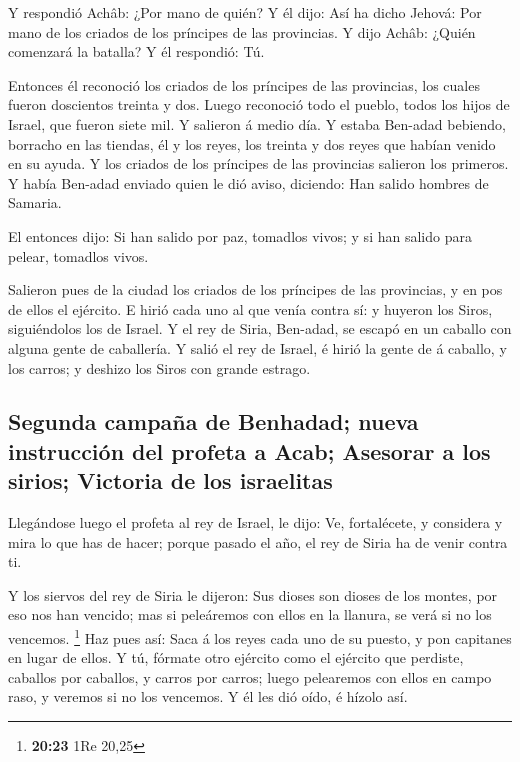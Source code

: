 Y respondió Achâb: ¿Por mano de quién? Y él dijo: Así ha
dicho Jehová: Por mano de los criados de los príncipes de las
provincias. Y dijo Achâb: ¿Quién comenzará la batalla? Y él respondió:
Tú.

 Entonces él reconoció los criados de los príncipes de las
provincias, los cuales fueron doscientos treinta y dos. Luego reconoció
todo el pueblo, todos los hijos de Israel, que fueron siete mil.
 Y salieron á medio día. Y estaba Ben-adad bebiendo,
borracho en las tiendas, él y los reyes, los treinta y dos reyes que
habían venido en su ayuda.  Y los criados de los príncipes
de las provincias salieron los primeros. Y había Ben-adad enviado quien
le dió aviso, diciendo: Han salido hombres de Samaria.

 El entonces dijo: Si han salido por paz, tomadlos vivos; y
si han salido para pelear, tomadlos vivos.

 Salieron pues de la ciudad los criados de los príncipes de
las provincias, y en pos de ellos el ejército.  E hirió
cada uno al que venía contra sí: y huyeron los Siros, siguiéndolos los
de Israel. Y el rey de Siria, Ben-adad, se escapó en un caballo con
alguna gente de caballería.  Y salió el rey de Israel, é
hirió la gente de á caballo, y los carros; y deshizo los Siros con
grande estrago.

\hypertarget{segunda-campauxf1a-de-benhadad-nueva-instrucciuxf3n-del-profeta-a-acab-asesorar-a-los-sirios-victoria-de-los-israelitas}{%
\subsection{Segunda campaña de Benhadad; nueva instrucción del profeta a
Acab; Asesorar a los sirios; Victoria de los
israelitas}\label{segunda-campauxf1a-de-benhadad-nueva-instrucciuxf3n-del-profeta-a-acab-asesorar-a-los-sirios-victoria-de-los-israelitas}}

 Llegándose luego el profeta al rey de Israel, le dijo: Ve,
fortalécete, y considera y mira lo que has de hacer; porque pasado el
año, el rey de Siria ha de venir contra ti.

 Y los siervos del rey de Siria le dijeron: Sus dioses son
dioses de los montes, por eso nos han vencido; mas si peleáremos con
ellos en la llanura, se verá si no los vencemos. \footnote{\textbf{20:23}
  1Re 20,25}  Haz pues así: Saca á los reyes cada uno de su
puesto, y pon capitanes en lugar de ellos.  Y tú, fórmate
otro ejército como el ejército que perdiste, caballos por caballos, y
carros por carros; luego pelearemos con ellos en campo raso, y veremos
si no los vencemos. Y él les dió oído, é hízolo así.

